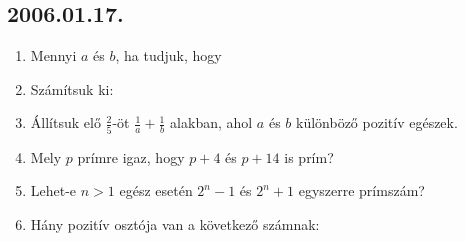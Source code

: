 \subsection*{2006.01.17.}
\begin{enumerate}
\item Mennyi $a$ és $b$, ha tudjuk, hogy 

\item Számítsuk ki:

\item Állítsuk elő $\frac{2}{5}$-öt $\frac{1}{a}+\frac{1}{b}$ alakban, ahol $a$ és $b$ különböző pozitív egészek.

\item Mely $p$ prímre igaz, hogy $p+4$ és $p+14$ is prím?

\item Lehet-e $n>1$ egész esetén $2^n-1$ és $2^n+1$ egyszerre prímszám?

\item Hány pozitív osztója van a következő számnak:
\end{enumerate}

